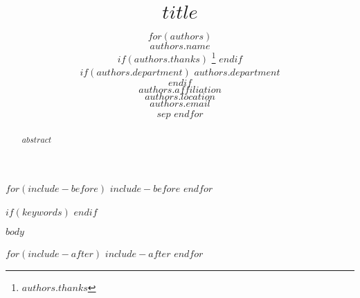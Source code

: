 \documentclass{article}
\title{$title$}
\author{
  $for(authors)$

  $authors.name$

  $if(authors.thanks)$
  \thanks{$authors.thanks$}
  $endif$ \\

  $if(authors.department)$
  $authors.department$ \\
  $endif$

  $authors.affiliation$ \\
  $authors.location$ \\
  \texttt{$authors.email$} \\

  $sep$ \And
  $endfor$
}
\begin{document}
\maketitle

$for(include-before)$
$include-before$
$endfor$

\begin{abstract}
$abstract$
\end{abstract}

$if(keywords)$
$endif$

$body$




$for(include-after)$
$include-after$
$endfor$
\end{document}
